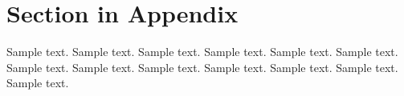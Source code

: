 \documentclass[preprint,12pt,3p]{elsarticle}
\begin{document}
\section{Section in Appendix}
\label{appendix-sec1}

Sample text. Sample text. Sample text. Sample text. Sample text. Sample text. 
Sample text. Sample text. Sample text. Sample text. Sample text. Sample text. 
Sample text. 




% 
% 
% 
% 
% 
% 
% 
% 
% 
% 
% 
% 


\end{document}
